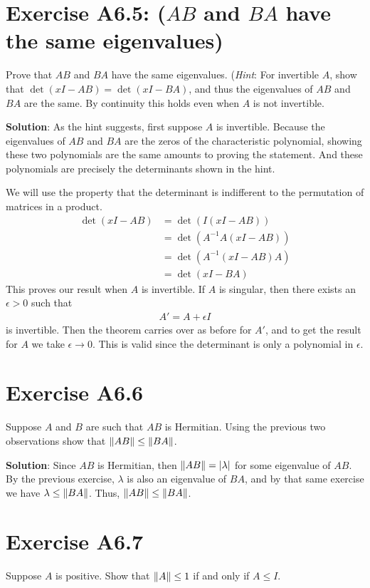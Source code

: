 \documentclass{book}
\begin{document}
\section*{Exercise A6.5: ($AB$ and $BA$ have the same eigenvalues)}
    Prove that $AB$ and $BA$ have the same eigenvalues. (\emph{Hint}: For invertible $A$, show that $\det(xI-AB) = \det(xI-BA)$, and thus the eigenvalues of $AB$ and $BA$ are the same. By continuity this holds even when $A$ is not invertible.
    
    \textbf{Solution}: As the hint suggests, first suppose $A$ is invertible. Because the eigenvalues of $AB$ and $BA$ are the zeros of the characteristic polynomial, showing these two polynomials are the same amounts to proving the statement. And these polynomials are precisely the determinants shown in the hint. 
    
    We will use the property that the determinant is indifferent to the permutation of matrices in a product.
    \begin{align}
        \det(xI-AB) &= \det(I(xI-AB)) \\
        &= \det(A^{-1}A(xI-AB)) \\
        &= \det(A^{-1}(xI-AB)A) \\
        &= \det(xI-BA)
    \end{align}
    This proves our result when $A$ is invertible. If $A$ is singular, then there exists an $\epsilon>0$ such that
    \begin{align}
        A' = A + \epsilon I 
    \end{align}
    is invertible. Then the theorem carries over as before for $A'$, and to get the result for $A$ we take $\epsilon\rightarrow 0$. This is valid since the determinant is only a polynomial in $\epsilon$.
    
\section*{Exercise A6.6}
    Suppose $A$ and $B$ are such that $AB$ is Hermitian. Using the previous two observations show that $\norm{AB}\leq\norm{BA}$.
    
    \textbf{Solution}: Since $AB$ is Hermitian, then $\norm{AB} = \abs{\lambda}$ for some eigenvalue of $AB$. By the previous exercise, $\lambda$ is also an eigenvalue of $BA$, and by that same exercise we have $\lambda \leq \norm{BA}$. Thus, $\norm{AB}
    \leq\norm{BA}$.
    
\section*{Exercise A6.7}
    Suppose $A$ is positive. Show that $\norm{A}\leq 1$ if and only if $A \leq I$.
    
\end{document}
